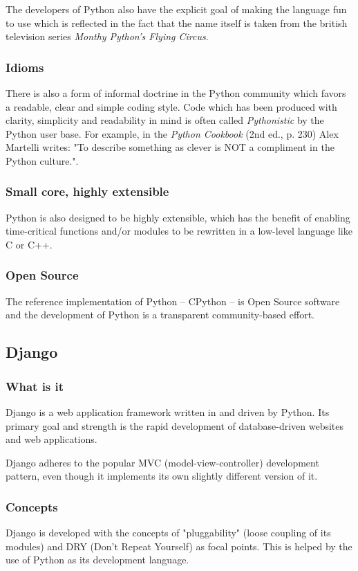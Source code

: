 \documentclass[a4paper,10pt]{article}
\begin{document}
The developers of Python also have the explicit goal of making the language fun to use which is reflected in the fact that the name itself is taken from the british television series \textit{Monthy Python's Flying Circus}.

\subsubsection{Idioms}
There is also a form of informal doctrine in the Python community which favors a readable, clear and simple coding style. Code which has been produced with clarity, simplicity and readability in mind is often called \textit{Pythonistic} by the Python user base. For example, in the \textit{Python Cookbook} (2nd ed., p. 230) Alex Martelli writes: "To describe something as clever is NOT a compliment in the Python culture.".

\subsubsection{Small core, highly extensible}
Python is also designed to be highly extensible, which has the benefit of enabling time-critical functions and/or modules to be rewritten in a low-level language like C or C++.

\subsubsection{Open Source}
The reference implementation of Python -- CPython -- is Open Source software and the development of Python is a transparent community-based effort.

\subsection{Django}
\subsubsection{What is it}
Django is a web application framework written in and driven by Python. Its primary goal and strength is the rapid development of database-driven websites and web applications. 

Django adheres to the popular MVC (model-view-controller) development pattern, even though it implements its own slightly different version of it. 

\subsubsection{Concepts}
Django is developed with the concepts of "pluggability" (loose coupling of its modules) and DRY (Don't Repeat Yourself) as focal points. This is helped by the use of Python as its development language.
\end{document}
